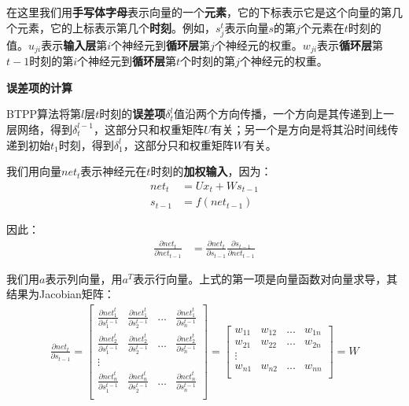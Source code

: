在这里我们用\textbf{手写体字母}表示向量的一个\textbf{元素}，它的下标表示它是这个向量的第几个元素，它的上标表示第几个\textbf{时刻}。例如，\(s_j^t\)表示向量$s$的第$j$个元素在$t$时刻的值。\(u_{ji}\)表示\textbf{输入层}第$i$个神经元到\textbf{循环层}第$j$个神经元的权重。\(w_{ji}\)表示\textbf{循环层}第$t-1$时刻的第$i$个神经元到\textbf{循环层}第$t$个时刻的第$j$个神经元的权重。

\textbf{误差项的计算}

BTPP算法将第$l$层$t$时刻的\textbf{误差项}\(\delta_t^l\)值沿两个方向传播，一个方向是其传递到上一层网络，得到\(\delta_t^{l-1}\)，这部分只和权重矩阵$U$有关；另一个是方向是将其沿时间线传递到初始\(t_1\)时刻，得到\(\delta_1^l\)，这部分只和权重矩阵$W$有关。

我们用向量\({net}_t\)表示神经元在$t$时刻的\textbf{加权输入}，因为：
\begin{align*}
	{net}_t   & =U{x}_t+W{s}_{t-1} \\
	{s}_{t-1} & =f({net}_{t-1})
\end{align*}


因此：
\begin{align*}
	\frac{\partial{{net}_t}}{\partial{{net}_{t-1}}} & =\frac{\partial{{net}_t}}{\partial{{s}_{t-1}}}\frac{\partial{{s}_{t-1}}}{\partial{{net}_{t-1}}}
\end{align*}


我们用$a$表示列向量，用\({a}^T\)表示行向量。上式的第一项是向量函数对向量求导，其结果为Jacobian矩阵：
\begin{align*}
	\frac{\partial{{net}_t}}{\partial{{s}_{t-1}}} =
	\begin{bmatrix}
		\frac{\partial{net_1^t}}{\partial{s_1^{t-1}}} & \frac{\partial{net_1^t}}{\partial{s_2^{t-1}}} & ... & \frac{\partial{net_1^t}}{\partial{s_n^{t-1}}} \\
		\frac{\partial{net_2^t}}{\partial{s_1^{t-1}}} & \frac{\partial{net_2^t}}{\partial{s_2^{t-1}}} & ... & \frac{\partial{net_2^t}}{\partial{s_n^{t-1}}} \\
		\vdots                                                                                                                                              \\
		\frac{\partial{net_n^t}}{\partial{s_1^{t-1}}} & \frac{\partial{net_n^t}}{\partial{s_2^{t-1}}} & ... & \frac{\partial{net_n^t}}{\partial{s_n^{t-1}}} \\
	\end{bmatrix}
	=\begin{bmatrix}
		w_{11} & w_{12} & ... & w_{1n} \\
		w_{21} & w_{22} & ... & w_{2n} \\
		\vdots                         \\
		w_{n1} & w_{n2} & ... & w_{nn} \\
	\end{bmatrix}=W
\end{align*}


